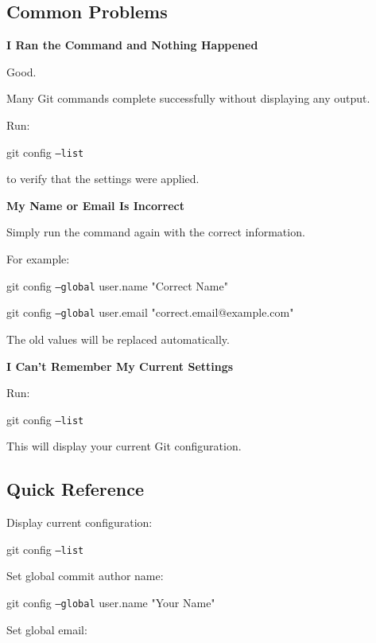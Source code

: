 \documentclass{csc2059practical}
\begin{document}
\subsection{Common Problems}
\begin{commonerror}
\textbf{I Ran the Command and Nothing Happened}\par
\medskip
Good.

Many Git commands complete successfully without displaying any output.

Run:
\begin{terminalplain}
  git config \texttt{--list}
\end{terminalplain}
to verify that the settings were applied.
\end{commonerror}

\begin{commonerror}
\textbf{My Name or Email Is Incorrect}\par
\medskip
Simply run the command again with the correct information.

For example:
\begin{terminalplain}
  git config \texttt{--global} user.name "Correct Name"
\end{terminalplain}
\begin{terminalplain}
  git config \texttt{--global} user.email "correct.email@example.com"
\end{terminalplain}
The old values will be replaced automatically.
\end{commonerror}

\begin{commonerror}
\textbf{I Can't Remember My Current Settings}\par
\medskip
Run:
\begin{terminalplain}
  git config \texttt{--list}
\end{terminalplain}
This will display your current Git configuration.
\end{commonerror}

\subsection{Quick Reference}
Display current configuration:

\begin{terminalplain}
git config \texttt{--list}
\end{terminalplain}
Set global commit author name:

\begin{terminalplain}
git config \texttt{--global} user.name "Your Name"
\end{terminalplain}
Set global email:
\end{document}
